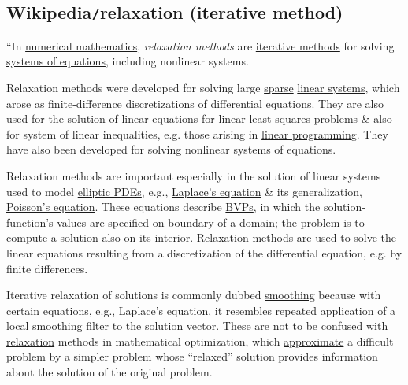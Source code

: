 \documentclass{article}
\begin{document}

\subsection{Wikipedia{\tt/}relaxation (iterative method)}
``In \href{https://en.wikipedia.org/wiki/Numerical_mathematics}{numerical mathematics}, {\it relaxation methods} are \href{https://en.wikipedia.org/wiki/Iterative_method}{iterative methods} for solving \href{https://en.wikipedia.org/wiki/Simultaneous_equations}{systems of equations}, including nonlinear systems.

Relaxation methods were developed for solving large \href{https://en.wikipedia.org/wiki/Sparse_matrix}{sparse} \href{https://en.wikipedia.org/wiki/Linear_system}{linear systems}, which arose as \href{https://en.wikipedia.org/wiki/Finite_difference}{finite-difference} \href{https://en.wikipedia.org/wiki/Discretization}{discretizations} of differential equations. They are also used for the solution of linear equations for \href{https://en.wikipedia.org/wiki/Linear_least_squares_(mathematics)}{linear least-squares} problems \& also for system of linear inequalities, e.g. those arising in \href{https://en.wikipedia.org/wiki/Linear_programming}{linear programming}. They have also been developed for solving nonlinear systems of equations.

Relaxation methods are important especially in the solution of linear systems used to model \href{https://en.wikipedia.org/wiki/Elliptic_partial_differential_equation}{elliptic PDEs}, e.g., \href{https://en.wikipedia.org/wiki/Laplace%27s_equation}{Laplace's equation} \& its generalization, \href{https://en.wikipedia.org/wiki/Poisson%27s_equation}{Poisson's equation}. These equations describe \href{https://en.wikipedia.org/wiki/Boundary-value_problem}{BVPs}, in which the solution-function's values are specified on boundary of a domain; the problem is to compute a solution also on its interior. Relaxation methods are used to solve the linear equations resulting from a discretization of the differential equation, e.g. by finite differences.

Iterative relaxation of solutions is commonly dubbed \href{https://en.wikipedia.org/wiki/Smoothing}{smoothing} because with certain equations, e.g., Laplace's equation, it resembles repeated application of a local smoothing filter to the solution vector. These are not to be confused with \href{https://en.wikipedia.org/wiki/Relaxation_(approximation)}{relaxation} methods in mathematical optimization, which \href{https://en.wikipedia.org/wiki/Approximation_theory}{approximate} a difficult problem by a simpler problem whose ``relaxed'' solution provides information about the solution of the original problem.
\end{document}
